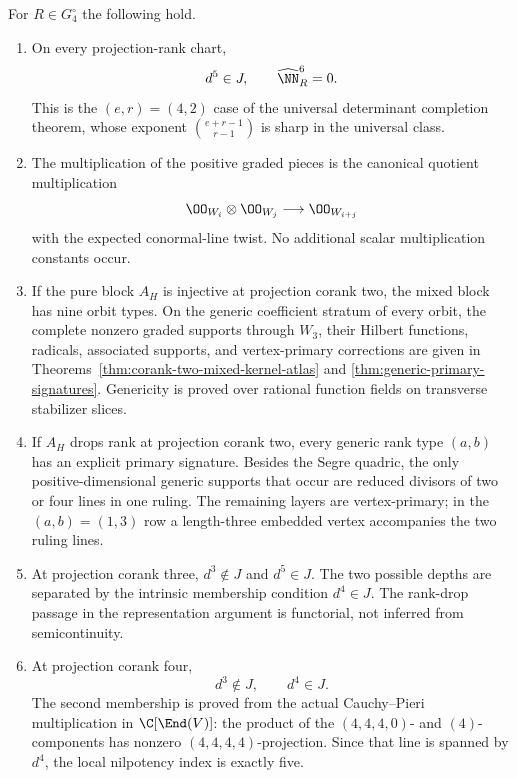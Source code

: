 \begin{theorem}
\label{thm:main-depth}
For \(R\in G_4^\circ\) the following hold.
\begin{enumerate}
\item On every projection-rank chart,
\[
 d^5\in J,\qquad \widehat\NN_R^6=0.
\]
This is the \((e,r)=(4,2)\) case of the universal determinant
completion theorem, whose exponent
\(\binom{e+r-1}{r-1}\) is sharp in the universal class.

\item The multiplication of the positive graded pieces is the
canonical quotient multiplication
\[
 \OO_{W_i}\otimes\OO_{W_j}\longrightarrow\OO_{W_{i+j}}
\]
with the expected conormal-line twist.  No additional scalar
multiplication constants occur.

\item If the pure block \(A_H\) is injective at projection corank
two, the mixed block has nine orbit types.  On the generic
coefficient stratum of every orbit, the complete nonzero graded
supports through \(W_3\), their Hilbert functions, radicals,
associated supports, and vertex-primary corrections are given in
Theorems~\ref{thm:corank-two-mixed-kernel-atlas} and
\ref{thm:generic-primary-signatures}.  Genericity is proved over
rational function fields on transverse stabilizer slices.

\item If \(A_H\) drops rank at projection corank two, every
generic rank type \((a,b)\) has an explicit primary signature.
Besides the Segre quadric, the only positive-dimensional generic
supports that occur are reduced divisors of two or four lines in one
ruling.  The remaining layers are vertex-primary; in the
\((a,b)=(1,3)\) row a length-three embedded vertex accompanies
the two ruling lines.

\item At projection corank three, \(d^3\notin J\) and
\(d^5\in J\).  The two possible depths are separated by the
intrinsic membership condition \(d^4\in J\).  The rank-drop
passage in the representation argument is functorial, not inferred
from semicontinuity.

\item At projection corank four,
\[
 d^3\notin J,\qquad d^4\in J.
\]
The second membership is proved from the actual Cauchy--Pieri
multiplication in \(\C[\End(V)]\): the product of the
\((4,4,4,0)\)- and \((4)\)-components has nonzero
\((4,4,4,4)\)-projection.  Since that line is spanned by
\(d^4\), the local nilpotency index is exactly five.
\end{enumerate}
\end{theorem}

